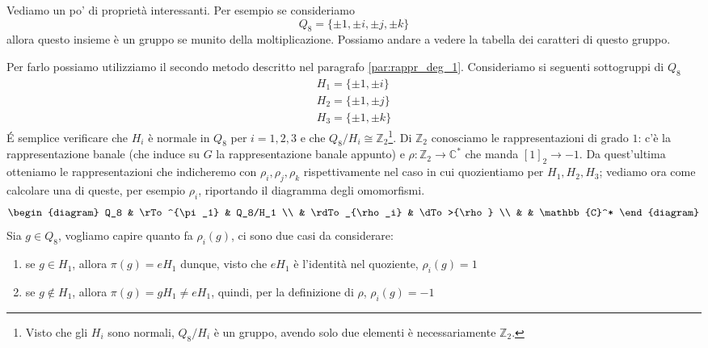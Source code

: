 \documentclass[11pt]{article}
\theoremstyle{plain}
\theoremstyle{definition}
\theoremstyle{remark}
\newcommand{\C}{\mathbb{C}}
\newcommand{\Z}{\mathbb{Z}}
\newcommand{\tridiag}[6]{
	  \begin{diagram}
	  #1 & \rTo^{#2}  & #3        \\
	     & \rdTo_{#6} & \dTo>{#4}   \\
	     &          & #5
	  \end{diagram}
}
\begin{document}
Vediamo un po' di proprietà interessanti. Per esempio se consideriamo 
\[ Q_8 =  \{\pm 1, \pm i, \pm j, \pm k \}\]
allora questo insieme è un gruppo se munito della moltiplicazione. Possiamo andare a vedere la tabella dei caratteri di questo gruppo. 

Per farlo possiamo utilizziamo il secondo metodo descritto nel paragrafo \eqref{par:rappr_deg_1}. Consideriamo si seguenti sottogruppi di $Q_8$
\begin{align*}
	H_1=\{ \pm1, \pm i \}\\
	H_2=\{ \pm1, \pm j \}\\
	H_3=\{ \pm1, \pm k \}
\end{align*}
\'E semplice verificare che $H_i$ è normale in $Q_8$ per $i=1,2,3$ e che $Q_8/H_i\cong \Z_2$\footnote{Visto che gli $H_i$ sono normali, $Q_8/H_i$ è un gruppo, avendo solo due elementi è necessariamente $\Z_2$.}. Di $\Z_2$ conosciamo le rappresentazioni di grado $1$: c'è la rappresentazione banale (che induce su $G$ la rappresentazione banale appunto) e $\rho:\Z_2\to \C^*$ che manda $[1]_2\to -1$. Da quest'ultima otteniamo le rappresentazioni che indicheremo con $\rho_i, \rho_j, \rho_k$ rispettivamente nel caso in cui quozientiamo per $H_1, H_2, H_3$; vediamo ora come calcolare una di queste, per esempio $\rho_i$, riportando il diagramma degli omomorfismi.
\[\tridiag {Q_8} {\pi_1} {Q_8/H_1} \rho {\C^*} {\rho_i}\]
Sia $g\in Q_8$, vogliamo capire quanto fa $\rho_i(g)$, ci sono due casi da considerare:
\begin{enumerate}
	\item se $g\in H_1$, allora $\pi(g) = eH_1$ dunque, visto che $eH_1$ è l'identità nel quoziente, $\rho_i(g)=1$
	\item se $g\not\in H_1$, allora $\pi(g) =gH_1\neq eH_1$, quindi, per la definizione di $\rho$, $\rho_i(g)=-1$
\end{enumerate}
\end{document}
